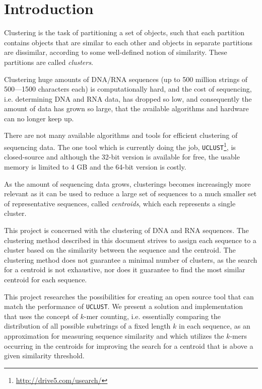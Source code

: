 \section{Introduction}


Clustering is the task of partitioning a set of objects, such that each
partition contains objects that are similar to each other and objects in
separate partitions are dissimilar, according to some well-defined notion of
similarity. These partitions are called \emph{clusters}.

Clustering huge amounts of DNA/RNA sequences (up to 500 million strings of
500—1500 characters each) is computationally hard, and the cost of sequencing,
i.e. determining DNA and RNA data, has dropped so low, and consequently the
amount of data has grown so large, that the available algorithms and hardware
can no longer keep up.

There are not many available algorithms and tools for efficient clustering of
sequencing data. The one tool which is currently doing the job,
\texttt{UCLUST}\footnote{\url{http://drive5.com/usearch/}}, is closed-source
and although the 32-bit version is available for free, the usable memory is
limited to 4 GB and the 64-bit version is costly.

As the amount of sequencing data grows, clusterings becomes increasingly more
relevant as it can be used to reduce a large set of sequences to a much smaller
set of representative sequences, called \emph{centroids}, which each represents
a single cluster.

This project is concerned with the clustering of DNA and RNA sequences. The
clustering method described in this document strives to assign each sequence to
a cluster based on the similarity between the sequence and the centroid. The
clustering method does not guarantee a minimal number of clusters, as the
search for a centroid is not exhaustive, nor does it guarantee to find the most
similar centroid for each sequence.

This project researches the possibilities for creating an open source tool that
can match the performance of \texttt{UCLUST}. We present a solution and
implementation that uses the concept of $k$-mer counting, i.e. essentially
comparing the distribution of all possible substrings of a fixed length $k$ in
each sequence, as an approximation for measuring sequence similarity and which
utilizes the $k$-mers occurring in the centroids for improving the search for a
centroid that is above a given similarity threshold.

